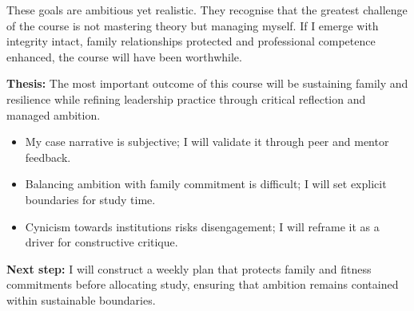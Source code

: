 These goals are ambitious yet realistic. They recognise that the greatest challenge of the course is not mastering theory but managing myself. If I emerge with integrity intact, family relationships protected and professional competence enhanced, the course will have been worthwhile.  

\textbf{Thesis:} The most important outcome of this course will be sustaining family and resilience while refining leadership practice through critical reflection and managed ambition.  

\begin{itemize}
	\item My case narrative is subjective; I will validate it through peer and mentor feedback.  
	\item Balancing ambition with family commitment is difficult; I will set explicit boundaries for study time.  
	\item Cynicism towards institutions risks disengagement; I will reframe it as a driver for constructive critique.  
\end{itemize}

\textbf{Next step:} I will construct a weekly plan that protects family and fitness commitments before allocating study, ensuring that ambition remains contained within sustainable boundaries.  
